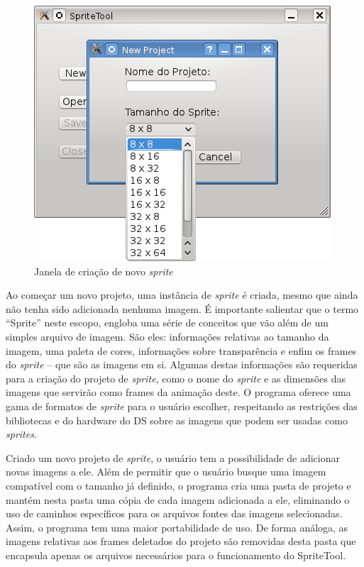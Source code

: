 \documentclass[brazil]{abnt}
\begin{document}
\begin{figure}[h!]
\centering
\includegraphics{imgs/spritetool1.png}
\caption{Janela de criação de novo \textit{sprite}} 
\end{figure}

Ao começar um novo projeto, uma instância de \textit{sprite} é criada, mesmo que ainda não tenha sido adicionada nenhuma imagem. É importante salientar que o termo “Sprite” neste escopo, engloba uma série de conceitos que vão além de um simples arquivo de imagem. São eles: informações relativas ao tamanho da imagem, uma paleta de cores, informações sobre transparência e enfim os frames do \textit{sprite} – que são as imagens em si.
Algumas destas informações são requeridas para a criação do projeto de \textit{sprite}, como o nome do \textit{sprite} e as dimensões das imagens que servirão como frames da animação deste. O programa oferece uma gama de formatos de \textit{sprite} para o usuário escolher, respeitando as restrições das bibliotecas e do hardware do DS sobre as imagens que podem ser usadas como \textit{sprites}.

Criado um novo projeto de \textit{sprite}, o usuário tem a possibilidade de adicionar novas imagens a ele. Além de permitir que o usuário busque uma imagem compatível com o tamanho já definido, o programa cria uma pasta de projeto e mantém nesta pasta uma cópia de cada imagem adicionada a ele, eliminando o uso de caminhos específicos para os arquivos fontes das imagens selecionadas. Assim, o programa tem uma maior portabilidade de uso. De forma análoga, as imagens relativas aos frames deletados do projeto são removidas desta pasta que encapsula apenas os arquivos necessários para o funcionamento do SpriteTool.
\end{document}
